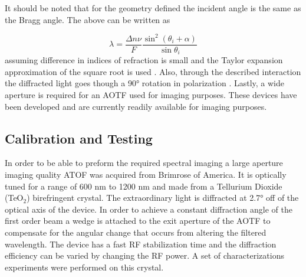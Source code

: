 It should be noted that for the geometry defined the incident angle is the same as the Bragg angle. The above can be written as

\begin{equation}
    \lambda  = \frac{\Delta n\nu}{F}\frac{\sin^{2}(\theta_{i}+\alpha)}{\sin\theta_{i}}
    \label{eqn:3.1:AOTFWavelengthDependance}
\end{equation}
assuming difference in indices of refraction is small and the Taylor expansion approximation of the square root is used \citep{Voloshinov2006}. Also, through the described interaction the diffracted light goes though a 90\si{\degree} rotation in polarization \citep{Voloshinov1996}. Lastly, a wide aperture is required for an AOTF used for imaging purposes. These devices have been developed \citep{Gass1991} and are currently readily available for imaging purposes.

\subsection{Calibration and Testing}

In order to be able to preform the required spectral imaging a large aperture imaging quality ATOF was acquired from Brimrose of America. It is optically tuned for a range of 600 nm to 1200 nm and made from a Tellurium Dioxide (TeO$_{2}$) birefringent crystal. The extraordinary light is diffracted at 2.7\si{\degree} off of the optical axis of the device. In order to achieve a constant diffraction angle of the first order beam a wedge is attached to the exit aperture of the AOTF to compensate for the angular change that occurs from altering the filtered wavelength.  The device has a fast RF stabilization time and the diffraction efficiency can be varied by changing the RF power. A set of characterizations experiments were performed on this crystal.


